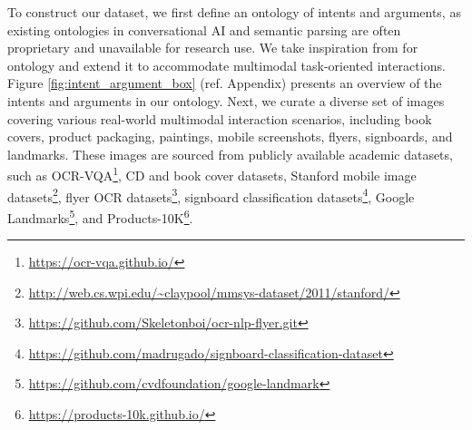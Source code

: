 To construct our dataset, we first define an ontology of intents and arguments, as existing ontologies in conversational AI and semantic parsing are often proprietary and unavailable for research use. We take inspiration from  for ontology and extend it to accommodate multimodal task-oriented interactions. Figure \ref{fig:intent_argument_box} (ref. Appendix) presents an overview of the intents and arguments in our ontology. Next, we curate a diverse set of images covering various real-world multimodal interaction scenarios, including book covers, product packaging, paintings, mobile screenshots, flyers, signboards, and landmarks. These images are sourced from publicly available academic datasets, such as OCR-VQA\footnote{\url{https://ocr-vqa.github.io/}}, CD and book cover datasets, Stanford mobile image datasets\footnote{\url{http://web.cs.wpi.edu/~claypool/mmsys-dataset/2011/stanford/}}, flyer OCR datasets\footnote{\url{https://github.com/Skeletonboi/ocr-nlp-flyer.git}}, signboard classification datasets\footnote{\url{https://github.com/madrugado/signboard-classification-dataset}}, Google Landmarks\footnote{\url{https://github.com/cvdfoundation/google-landmark}}, and Products-10K\footnote{\url{https://products-10k.github.io/}}.

